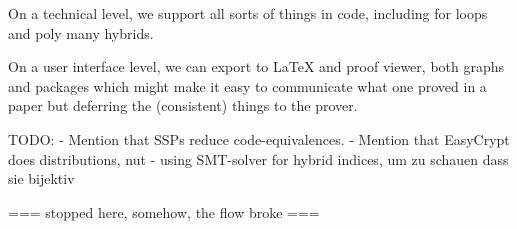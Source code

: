 On a technical level, we support all sorts of things in code, including for loops
and poly many hybrids.

On a user interface level, we can export to LaTeX and proof viewer, both graphs and packages which might make it easy to communicate what one proved in a paper but
deferring the (consistent) things to the prover.















TODO:
- Mention that SSPs reduce code-equivalences.
- Mention that EasyCrypt does distributions, nut 
- using SMT-solver for hybrid indices, um zu schauen dass sie bijektiv





=== stopped here, somehow, the flow broke ===

